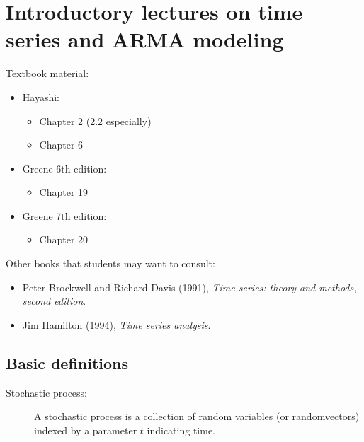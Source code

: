 
\chapter{Introductory lectures on time series and ARMA modeling}

Textbook material:
\begin{itemize}
\item Hayashi:
  \begin{itemize}
  \item Chapter 2 (2.2 especially)
  \item Chapter 6
  \end{itemize}
\item Greene 6th edition:
  \begin{itemize}
  \item Chapter 19
  \end{itemize}
\item Greene 7th edition:
  \begin{itemize}
  \item Chapter 20
  \end{itemize}
\end{itemize}

Other books that students may want to consult:
\begin{itemize}
\item Peter Brockwell and Richard Davis (1991), \emph{Time series:
    theory and methods, second edition}.
\item Jim Hamilton (1994), \emph{Time series analysis}.
\end{itemize}

\section{Basic definitions}

\begin{description}
\item[Stochastic process:]
A stochastic process is a collection of random variables (or
randomvectors) indexed by a parameter $t$ indicating time.
\end{description}

